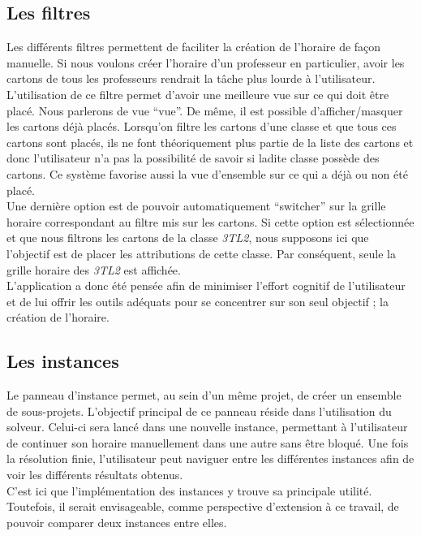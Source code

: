 \subsection{Les filtres}
Les différents filtres permettent de faciliter la création de l'horaire de façon manuelle. Si nous voulons créer l'horaire d'un professeur en particulier, avoir les cartons de tous les professeurs rendrait la tâche plus lourde à l'utilisateur. L'utilisation de ce filtre permet d'avoir une meilleure vue sur ce qui doit être placé. Nous parlerons de vue \enquote{vue}.
\newline
\indent
De même, il est possible d'afficher/masquer les cartons déjà placés. Lorsqu'on filtre les cartons d'une classe et que tous ces cartons sont placés, ils ne font théoriquement plus partie de la liste des cartons et donc l'utilisateur n'a pas la possibilité de savoir si ladite classe possède des cartons. Ce système favorise aussi la vue d'ensemble sur ce qui a déjà ou non été placé.\\
\newline
\indent
Une dernière option est de pouvoir automatiquement \enquote{switcher} sur la grille horaire correspondant au filtre mis sur les cartons. Si cette option est sélectionnée et que nous filtrons les cartons de la classe \textit{3TL2}, nous supposons ici que l'objectif est de placer les attributions de cette classe. Par conséquent, seule la grille horaire des \textit{3TL2} est affichée.\\
\newline
\indent
L'application a donc été pensée afin de minimiser l'effort cognitif de l'utilisateur et de lui offrir les outils adéquats pour se concentrer sur son seul objectif ; la création de l'horaire.


\subsection{Les instances}

Le panneau d'instance permet, au sein d'un même projet, de créer un ensemble de 
sous-projets. L'objectif principal de ce panneau réside dans l'utilisation du solveur. Celui-ci sera lancé dans une nouvelle instance, permettant à l'utilisateur de continuer son horaire manuellement dans une autre sans être bloqué. Une fois la résolution finie, l'utilisateur peut naviguer entre les différentes instances afin de voir les différents résultats obtenus. \\
\newline
\indent
C'est ici que l'implémentation des instances y trouve sa principale utilité. Toutefois, il serait envisageable, comme perspective d'extension à ce travail, de pouvoir comparer deux instances entre elles.


